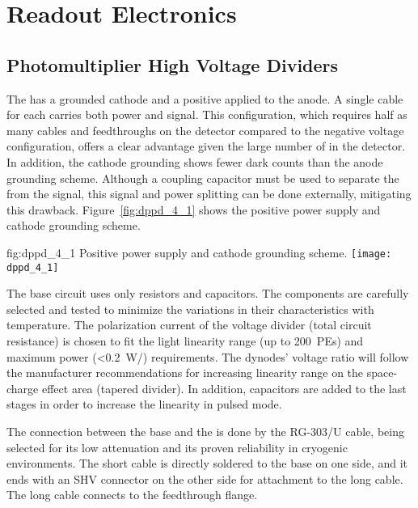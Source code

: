 \section{Readout Electronics}
\label{sec:dp-pds-electronics}

\subsection{Photomultiplier High Voltage Dividers}
\label{sec:fddp-pd-4.1}

The  has a grounded cathode and a positive  applied to the anode. A single cable for each  carries both power and signal. This configuration, which requires half as many cables and feedthroughs on the detector compared to the negative voltage configuration, offers a clear advantage given the large number of  in the detector. In addition, the cathode grounding shows fewer dark counts than the anode grounding scheme. Although a coupling capacitor must be used to separate the  from the  signal, this signal and power splitting can be done externally, mitigating this drawback.  Figure~\ref{fig:dppd_4_1} shows the positive power supply and cathode grounding scheme.

\begin{dunefigure}{fig:dppd_4_1}
{Positive power supply and cathode grounding scheme.}
\texttt{[image: dppd\_4\_1]}
\end{dunefigure}

The  base circuit uses only resistors and capacitors. The components are carefully selected and tested to minimize the variations in their characteristics with temperature. The polarization current of the voltage divider (total circuit resistance) is chosen to fit the  light linearity range (up to \SI{200}{PEs}) and maximum power (\SI{<0.2}{W/}) requirements. The dynodes' voltage ratio will follow the manufacturer recommendations for increasing linearity range on the space-charge effect area (tapered divider). In addition, capacitors are added to the last stages in order to increase the  linearity in pulsed mode.

The connection between the  base and the \fdth is done by the RG-303/U cable, being selected for its low attenuation and its proven reliability in cryogenic environments. The short cable is directly soldered to the  base on one side, and it ends with an SHV connector on the other side for attachment to the long  cable. The long cable connects to the feedthrough flange.

